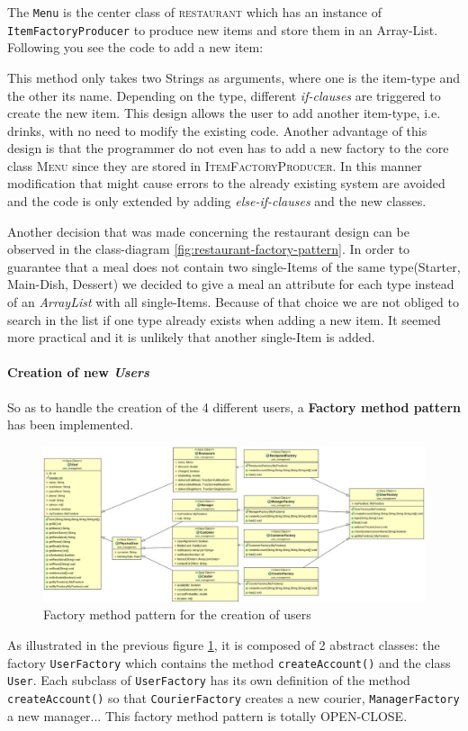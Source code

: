 The \lstinline|Menu| is the center class of \textsc{restaurant} which has an instance of 
\lstinline|ItemFactoryProducer| to produce new items and store them in an Array-List. Following you
see the code to add a new item:


This method only takes two Strings as arguments, where one is the item-type and the other its
name. Depending on the type, different \textit{if-clauses} are triggered to create the new item.
This design allows the user to add another item-type, i.e. drinks, with no need to modify the
existing code. Another advantage of this design is that the programmer do not even has to add a new
factory to the core class \textsc{Menu} since they are stored in \textsc{ItemFactoryProducer}. In
this manner modification that might cause errors to the already existing system are avoided and
the code is only extended by adding \textit{else-if-clauses} and the new classes. 

Another decision that was made concerning the restaurant design can be observed in the
class-diagram \ref{fig:restaurant-factory-pattern}. In order to guarantee that a meal does not
contain two single-Items of the same type(Starter, Main-Dish, Dessert) we decided to give a meal an
attribute for each type instead of an \textit{ArrayList} with all single-Items. Because of that
choice we are not obliged to search in the list if one type already exists when adding a new item.
It seemed more practical and it is unlikely that another single-Item is added.

\paragraph{Creation of new \textit{Users}}
So as to handle the creation of the 4 different users, a \textbf{Factory method pattern} has been implemented.
\begin{figure}[H]
	\centering
	\includegraphics[width=1\linewidth]{./ima/userFactory.jpg}
	\caption{Factory method pattern for the creation of users}
	\label{fig:user-factory-pattern}
\end{figure}
As illustrated in the previous figure \ref{fig:user-factory-pattern}, it is composed of 2 abstract classes: the factory \lstinline|UserFactory| which contains the method \lstinline|createAccount()| and the class \lstinline|User|. Each subclass of \lstinline|UserFactory| has its own definition of the method \lstinline|createAccount()| so that \lstinline|CourierFactory| creates a new courier, \lstinline|ManagerFactory| a new manager... This factory method pattern is totally OPEN-CLOSE.
